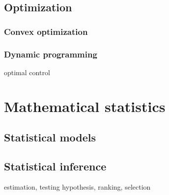 \documentclass{../../large}
\begin{document}
\chapter{Optimization}
\section{Convex optimization}
\section{Dynamic programming}
optimal control




\part{Mathematical statistics}
\chapter{Statistical models}
\chapter{Statistical inference}
estimation, testing hypothesis, ranking, selection
\chapter{}
\end{document}
